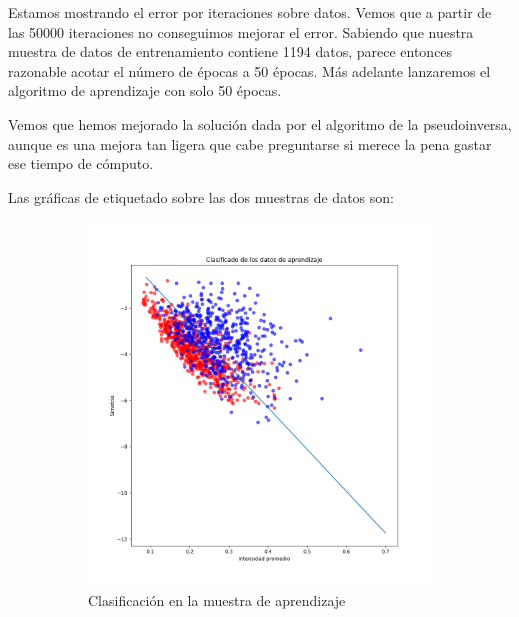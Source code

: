 \documentclass[11pt]{article}
\begin{document}
Estamos mostrando el error por iteraciones sobre datos. Vemos que a partir de las 50000 iteraciones no conseguimos mejorar el error. Sabiendo que nuestra muestra de datos de entrenamiento contiene 1194 datos, parece entonces razonable acotar el número de épocas a 50 épocas. Más adelante lanzaremos el algoritmo de aprendizaje con solo 50 épocas.

Vemos que hemos mejorado la solución dada por el algoritmo de la pseudoinversa, aunque es una mejora tan ligera que cabe preguntarse si merece la pena gastar ese tiempo de cómputo.

Las gráficas de etiquetado sobre las dos muestras de datos son:

\begin{figure}[H]
    \centering
    \begin{subfigure}{0.3\textwidth}
        \includegraphics[scale=0.30]{clasificacion_pocket_learning}
        \caption{Clasificación en la muestra de aprendizaje}
    \end{subfigure} \hspace{0.2\textwidth}
    \begin{subfigure}{0.3\textwidth}

\end{subfigure}
\end{figure}
\end{document}

